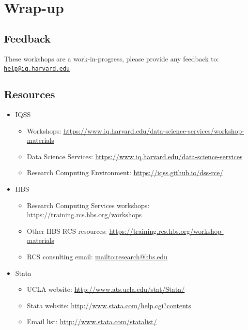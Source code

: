 \documentclass[
]{book}
\providecommand{\tightlist}{%
  \setlength{\itemsep}{0pt}\setlength{\parskip}{0pt}}
\begin{document}
\hypertarget{wrap-up-8}{%
\section{Wrap-up}\label{wrap-up-8}}

\hypertarget{feedback-8}{%
\subsection{Feedback}\label{feedback-8}}

These workshops are a work-in-progress, please provide any feedback to: \href{mailto:help@iq.harvard.edu}{\nolinkurl{help@iq.harvard.edu}}

\hypertarget{resources-11}{%
\subsection{Resources}\label{resources-11}}

\begin{itemize}
\tightlist
\item
  IQSS

  \begin{itemize}
  \tightlist
  \item
    Workshops: \url{https://www.iq.harvard.edu/data-science-services/workshop-materials}
  \item
    Data Science Services: \url{https://www.iq.harvard.edu/data-science-services}
  \item
    Research Computing Environment: \url{https://iqss.github.io/dss-rce/}
  \end{itemize}
\item
  HBS

  \begin{itemize}
  \tightlist
  \item
    Research Computing Services workshops: \url{https://training.rcs.hbs.org/workshops}
  \item
    Other HBS RCS resources: \url{https://training.rcs.hbs.org/workshop-materials}
  \item
    RCS consulting email: \url{mailto:research@hbs.edu}
  \end{itemize}
\item
  Stata

  \begin{itemize}
  \tightlist
  \item
    UCLA website: \url{http://www.ats.ucla.edu/stat/Stata/}
  \item
    Stata website: \url{http://www.stata.com/help.cgi?contents}
  \item
    Email list: \url{http://www.stata.com/statalist/}
  \end{itemize}
\end{itemize}
\end{document}
